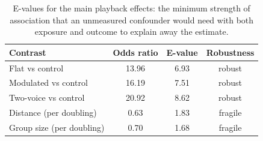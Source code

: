 \begin{table}[!ht]
\centering
\caption{E-values for the main playback effects: the minimum strength of association that an unmeasured confounder would need with both exposure and outcome to explain away the estimate.}
\label{tab:p6evalue}
\small
\begin{tabular}{lccc}
\toprule
Contrast & Odds ratio & E-value & Robustness \\
\midrule
Flat vs control & 13.96 & 6.93 & robust \\
Modulated vs control & 16.19 & 7.51 & robust \\
Two-voice vs control & 20.92 & 8.62 & robust \\
Distance (per doubling) & 0.63 & 1.83 & fragile \\
Group size (per doubling) & 0.70 & 1.68 & fragile \\
\bottomrule
\end{tabular}
\end{table}